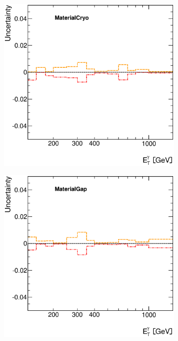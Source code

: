 \documentclass[12pt, twoside]{article}
\numberwithin{equation}{section}
\numberwithin{figure}{section}
\newenvironment{changemargin}[2]{%
\begin{list}{}{%
\setlength{\topsep}{0pt}%
\setlength{\leftmargin}{#1}%
\setlength{\rightmargin}{#2}%
\setlength{\listparindent}{\parindent}%
\setlength{\itemindent}{\parindent}%
\setlength{\parsep}{\parskip}%
}%
\item[]}{\end{list}}
\begin{document}
\begin{figure}
    \checkoddpage
    \ifoddpage
        \begin{changemargin}{-1.0cm}{-0.75cm}
    \else
        \begin{changemargin}{-0.75cm}{-1.0cm}
    \fi
    \centering
        \begin{subfigure}[b]{0.27\textwidth}
            \includegraphics[width=\textwidth]{./images/PhotonSystematics/PhotonSystematic-16.eps}
        \end{subfigure}
        \begin{subfigure}[b]{0.27\textwidth}
            \includegraphics[width=\textwidth]{./images/PhotonSystematics/PhotonSystematic-17.eps}

\end{subfigure}
\end{changemargin}
\end{changemargin}
\end{figure}
\end{document}
